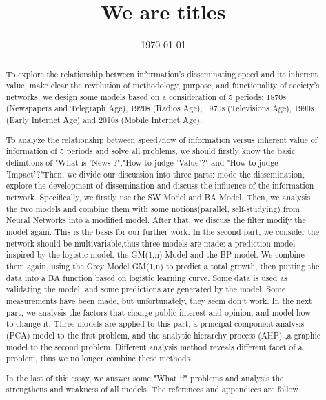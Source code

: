\documentclass[a4paper,11pt]{article}
\title{\huge \textbf{We are titles}}
\author{ \team}
\date{\today}
\begin{document}
\begin{abstract}
To explore the relationship between information's disseminating speed and its inherent value, make clear the revolution of methodology, purpose, and functionality of society's networks, we design some models based on a consideration of 5 periods: 1870s (Newspapers and Telegraph Age), 1920s (Radios Age), 1970s (Televisions Age), 1990s (Early Internet Age) and 2010s (Mobile Internet Age).
\par To analyze the relationship between speed/flow of information versus inherent value of information of 5 periods and solve all problems, we should firstly know the basic definitions of "What is 'News'?","How to judge 'Value'?" and "How to judge 'Impact'?"Then, we divide our discussion into three parts: mode the dissemination, explore the development of dissemination and discuss the influence of the information network. Specifically, we firstly use the SW Model and BA Model. Then, we analysis the two models and combine them with some notions(parallel, self-studying) from Neural Networks into a modified model. After that, we discuss the filter modify the model again. This is the basis for our further work. In the second part, we consider the network should be multivariable,thus three models are made: a prediction model inspired by the logistic model, the GM(1,n) Model and the BP model. We combine them again, using the Grey Model GM(1,n) to predict a total growth, then putting the data into a BA function based on logistic learning curve. Some data is used as validating the model, and some predictions are generated by the model. Some measurements have been made, but unfortunately, they seem don't work. In the next part, we analysis the factors that change public interest and opinion, and model how to change it. Three models are applied to this part, a principal component analysis (PCA) model to the first problem, and the analytic hierarchy process (AHP) ,a graphic model to the second problem. Different analysis method reveals different facet of a problem, thus we no longer combine these methods.
\par In the last of this essay, we answer some "What if" problems and analysis the strengthens and weakness of all models. The references and appendices are follow.
\end{abstract}
\pagestyle{fancy} 
\maketitle
\end{document}
